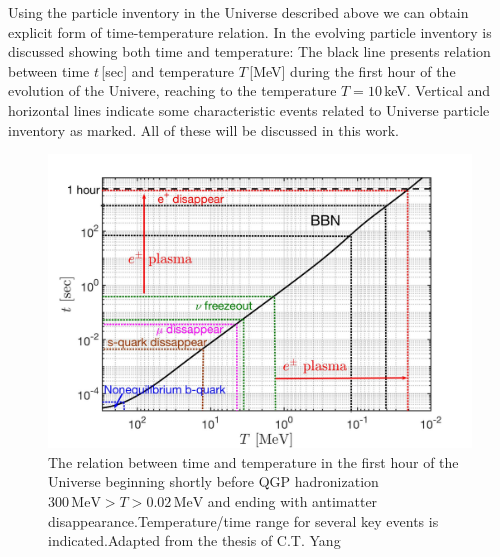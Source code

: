 Using the particle inventory in the Universe described above we can obtain explicit form of time-temperature relation. In  the evolving particle inventory is discussed  showing both time and temperature: The black line presents relation between time $t$\,[sec] and temperature $T$\,[MeV] during the first hour of the evolution of the Univere, reaching to the temperature $T=10$\,keV. Vertical and horizontal lines indicate some characteristic events related to Universe particle inventory as marked. All of these will be discussed in this work. 
\begin{figure}
\centerline{\includegraphics[width=\textwidth,width=\linewidth]{01-introduction/Figures/CosmicTimeTemperature.jpg}}
 \caption{The relation between time and temperature in the first hour of the Universe beginning shortly before QGP hadronization $300\,\mathrm{MeV}>T>0.02\,\mathrm{MeV} $ and ending with antimatter disappearance.Temperature/time range for several key events is indicated.Adapted from the thesis of C.T. Yang \cite{Yang:2024ret}}
 \label{Fig:Overview}
\end{figure}

